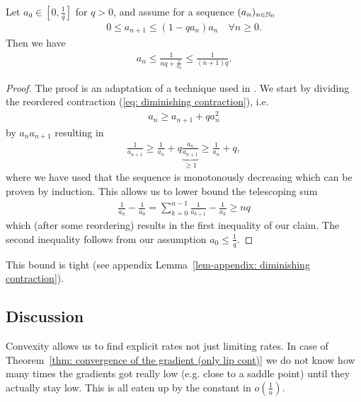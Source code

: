 \begin{lemma}
	\label{lem: upper bound on diminishing contraction}
	Let \(a_0 \in [0, \frac{1}{q}]\) for \(q>0\), and assume for a sequence
	\((a_n)_{n\in\mathbb{N}_0}\)
	\begin{align}\label{eq: diminishing contraction}
		0\le a_{n+1} \le (1-q a_n)a_n \quad \forall n \ge 0.
	\end{align}
	Then we have
	\begin{align*}
		a_n \le \frac{1}{nq + \frac1{a_0}}\le\frac1{(n+1)q}.
	\end{align*}
\end{lemma}
\begin{proof}
	The proof is an adaptation of a technique used in \textcite[Theorem
	2.1.14]{nesterovLecturesConvexOptimization2018}. We start by dividing the
	reordered contraction (\ref{eq: diminishing contraction}), i.e.
	\begin{align*}
		a_n \ge a_{n+1} + qa_n^2
	\end{align*}
	by \(a_na_{n+1}\) resulting in
	\begin{align*}
		\frac1{a_{n+1}}
		\ge \frac1{a_n} + q \underbrace{\frac{a_n}{a_{n+1}}}_{\ge 1}
		\ge \frac1{a_n} + q,
	\end{align*}
	where we have used that the sequence is monotonously decreasing which
	can be proven by induction. This allows us to lower bound the telescoping
	sum
	\begin{align*}
		\frac1{a_n} - \frac1{a_0}
		= \sum_{k=0}^{n-1} \frac1{a_{k+1}} - \frac1{a_k}
		\ge nq
	\end{align*}
	which (after some reordering) results in the first inequality of our claim.
	The second inequality follows from our assumption \(a_0 \le \frac{1}{q}\).
\end{proof}
\begin{remark}
	This bound is tight (see appendix Lemma~\ref{lem-appendix: diminishing contraction}).
\end{remark}

\subsection{Discussion}

Convexity allows us to find explicit rates not just limiting rates. In case
of Theorem~\ref{thm: convergence of the gradient (only lip cont)} we do not
know how many times the gradients got really low (e.g. close to a saddle
point) until they actually stay low. This is all eaten up by the
constant in \(o(\tfrac1n)\).

